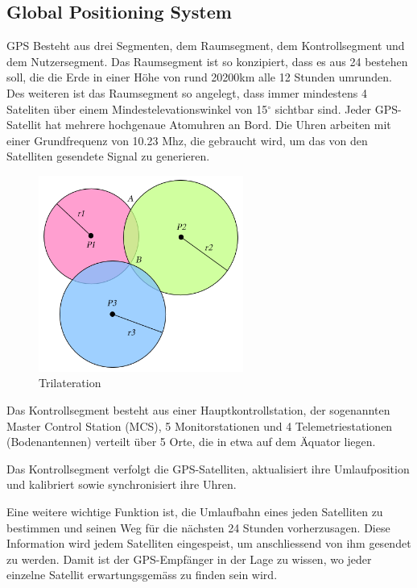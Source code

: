 \subsection{Global Positioning System}
GPS Besteht aus drei Segmenten, dem Raumsegment, dem Kontrollsegment und dem Nutzersegment. Das Raumsegment ist so konzipiert, dass es aus 24 bestehen soll, die die Erde in einer Höhe von rund 20200km alle 12 Stunden umrunden. Des weiteren ist das Raumsegment so angelegt, dass immer mindestens 4 Sateliten über einem Mindestelevationswinkel von 15$^\circ$ sichtbar sind. Jeder GPS-Satellit hat mehrere hochgenaue Atomuhren an Bord. Die Uhren arbeiten mit einer Grundfrequenz von 10.23 Mhz, die gebraucht wird, um das von den Satelliten gesendete Signal zu generieren. \cite{leicagps}

\begin{figure}[h]
  \centering
  \includegraphics[width=0.6\textwidth]{images/trilateration.png}
  \caption[Trilateration]{Trilateration \cite{trilateration}}
  \label{fig:trilateration}
\end{figure}

Das Kontrollsegment besteht aus einer Hauptkontrollstation, der sogenannten Master Control Station (MCS), 5 Monitorstationen und 4 Telemetriestationen (Bodenantennen) verteilt über 5 Orte, die in etwa auf dem Äquator liegen.\cite{leicagps}

Das Kontrollsegment verfolgt die GPS-Satelliten, aktualisiert ihre Umlaufposition und kalibriert sowie synchronisiert ihre Uhren.\cite{leicagps}

Eine weitere wichtige Funktion ist, die Umlaufbahn eines jeden Satelliten zu bestimmen und seinen Weg für die nächsten 24 Stunden vorherzusagen. Diese Information wird jedem Satelliten eingespeist, um anschliessend von ihm gesendet zu werden. Damit ist der GPS-Empfänger in der Lage zu wissen, wo jeder einzelne Satellit erwartungsgemäss zu finden sein wird.\cite{leicagps}

